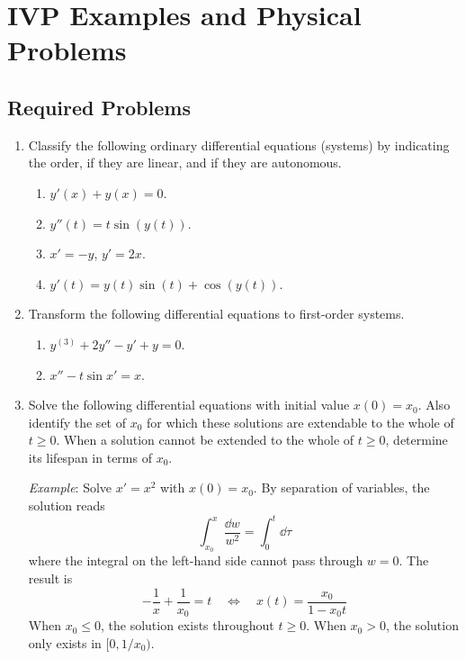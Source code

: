 \documentclass[../psets.tex]{subfiles}
\begin{document}
\section{IVP Examples and Physical Problems}
\subsection*{Required Problems}
\begin{enumerate}
    \item {}Classify the following ordinary differential equations (systems) by indicating the order, if they are linear, and if they are autonomous.
    \begin{enumerate}
        \item $y'(x)+y(x)=0$.
        \item $y''(t)=t\sin(y(t))$.
        \item $x'=-y$, $y'=2x$.
        \item $y'(t)=y(t)\sin(t)+\cos(y(t))$.
    \end{enumerate}
    \item Transform the following differential equations to first-order systems.
    \begin{enumerate}
        \item $y^{(3)}+2y''-y'+y=0$.
        \item $x''-t\sin x'=x$.
    \end{enumerate}
    \item Solve the following differential equations with initial value $x(0)=x_0$. Also identify the set of $x_0$ for which these solutions are extendable to the whole of $t\geq 0$. When a solution cannot be extended to the whole of $t\geq 0$, determine its lifespan in terms of $x_0$.\par
    \emph{Example}: Solve $x'=x^2$ with $x(0)=x_0$. By separation of variables, the solution reads
    \begin{equation*}
        \int_{x_0}^x\frac{\dd{w}}{w^2} = \int_0^t\dd\tau
    \end{equation*}
    where the integral on the left-hand side cannot pass through $w=0$. The result is
    \begin{equation*}
        -\frac{1}{x}+\frac{1}{x_0} = t
        \quad\Longleftrightarrow\quad
        x(t) = \frac{x_0}{1-x_0t}
    \end{equation*}
    When $x_0\leq 0$, the solution exists throughout $t\geq 0$. When $x_0>0$, the solution only exists in $[0,1/x_0)$.
    \begin{enumerate}

\end{enumerate}
\end{enumerate}
\end{document}
